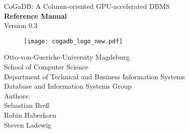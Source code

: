 \documentclass[a4paper]{book}
\begin{document}
\begin{titlepage}
 \begin{center}
  {\huge CoGaDB: A Column-oriented GPU-accelerated DBMS\\[1cm]}
  {\Large\bf Reference Manual\\[1.0cm]} 
  {\large Version 0.3}\\[0.2cm]
  \begin{figure}[h]
   \hbox{}\hfill
    \begin{minipage}[t]{10cm}
      \begin{center}
        \texttt{[image: cogadb\_logo\_new.pdf]}
      \end{center}
    \end{minipage} 
   \hfill\hbox{}
  \end{figure}
  {\LARGE Otto-von-Guericke-University Magdeburg}\\
  {\large School of Computer Science \\ Department of Technical and Business Information Systems \\ Database and Information Systems Group \\[2cm]}
\vfill
  {\small Authors:}\\[0.2cm] {\large Sebastian Breß}\\[0.2cm]{\large Robin Haberkorn}\\[0.2cm] {\large Steven Ladewig}\\[0.2cm]
\vfill
 \end{center}
\end{titlepage}
\end{document}
